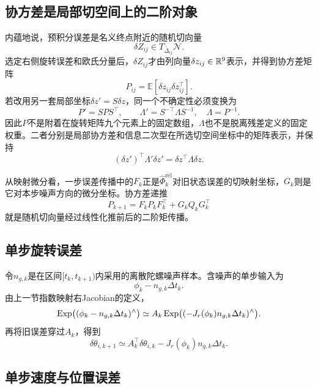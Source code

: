 \subsection{协方差是局部切空间上的二阶对象}

内蕴地说，预积分误差是名义终点附近的随机切向量
\[
    \delta Z_{ij}\in T_{\bar\Delta_{ij}}\mathcal N.
\]
选定右侧旋转误差和欧氏分量后，$\delta Z_{ij}$才由列向量$\delta z_{ij}\in\mathbb{R}^9$表示，并得到协方差矩阵
\[
    P_{ij}=\mathbb E[\delta z_{ij}\delta z_{ij}^\top].
\]
若改用另一套局部坐标$\delta z'=S\delta z$，同一个不确定性必须变换为
\[
    P'=SP S^\top,
    \qquad
    \Lambda'=S^{-\top}\Lambda S^{-1},
    \quad \Lambda=P^{-1}.
\]
因此$P$不是附着在旋转矩阵九个元素上的固定数组，$\Lambda$也不是脱离残差定义的固定权重。二者分别是局部协方差和信息二次型在所选切空间坐标中的矩阵表示，并保持
\[
    (\delta z')^\top\Lambda'\delta z'
    =\delta z^\top\Lambda\delta z.
\]

从映射微分看，一步误差传播中的$F_k$正是$\widehat\Phi_k^{\mathrm{rel}}$对旧状态误差的切映射坐标，$G_k$则是它对本步噪声方向的微分坐标。协方差递推
\[
    P_{k+1}=F_kP_kF_k^\top+G_kQ_kG_k^\top
\]
就是随机切向量经过线性化推前后的二阶矩传播。

\subsection{单步旋转误差}

令$n_{g,k}$是在区间$[t_k,t_{k+1})$内采用的离散陀螺噪声样本。含噪声的单步输入为
\[
    \phi_k-n_{g,k}\Delta t_k.
\]
由上一节指数映射右Jacobian的定义，
\[
    \operatorname{Exp}\bigl((\phi_k-n_{g,k}\Delta t_k)^\wedge\bigr)
    \simeq
    A_k\operatorname{Exp}\bigl((-J_r(\phi_k)n_{g,k}\Delta t_k)^\wedge\bigr).
\]
再将旧误差穿过$A_k$，得到
\[
\boxed{
    \delta\theta_{i,k+1}
    \simeq
    A_k^\top\delta\theta_{i,k}
    -J_r(\phi_k)n_{g,k}\Delta t_k.
}
\]

\subsection{单步速度与位置误差}

